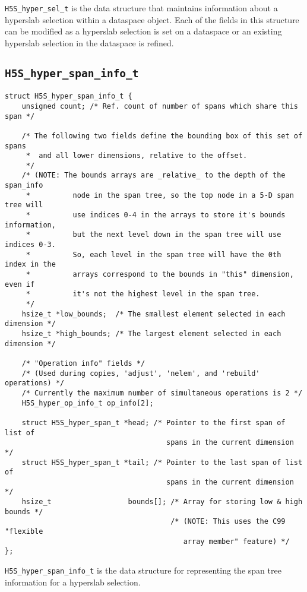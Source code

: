 \documentclass[../HDF5_RFC.tex]{subfiles}
\begin{document}
\texttt{H5S\_hyper\_sel\_t} is the data structure that maintains information about a
hyperslab selection within a dataspace object. Each of the fields in this structure
can be modified as a hyperslab selection is set on a dataspace or an existing hyperslab
selection in the dataspace is refined.

\subsection{\texttt{H5S\_hyper\_span\_info\_t}}
\label{apdx:h5s_struct_h5s_hyper_span_info_t}

\begin{verbatim}
struct H5S_hyper_span_info_t {
    unsigned count; /* Ref. count of number of spans which share this span */

    /* The following two fields define the bounding box of this set of spans
     *  and all lower dimensions, relative to the offset.
     */
    /* (NOTE: The bounds arrays are _relative_ to the depth of the span_info
     *          node in the span tree, so the top node in a 5-D span tree will
     *          use indices 0-4 in the arrays to store it's bounds information,
     *          but the next level down in the span tree will use indices 0-3.
     *          So, each level in the span tree will have the 0th index in the
     *          arrays correspond to the bounds in "this" dimension, even if
     *          it's not the highest level in the span tree.
     */
    hsize_t *low_bounds;  /* The smallest element selected in each dimension */
    hsize_t *high_bounds; /* The largest element selected in each dimension */

    /* "Operation info" fields */
    /* (Used during copies, 'adjust', 'nelem', and 'rebuild' operations) */
    /* Currently the maximum number of simultaneous operations is 2 */
    H5S_hyper_op_info_t op_info[2];

    struct H5S_hyper_span_t *head; /* Pointer to the first span of list of
                                      spans in the current dimension */
    struct H5S_hyper_span_t *tail; /* Pointer to the last span of list of
                                      spans in the current dimension */
    hsize_t                  bounds[]; /* Array for storing low & high bounds */
                                       /* (NOTE: This uses the C99 "flexible
                                          array member" feature) */
};
\end{verbatim}

\texttt{H5S\_hyper\_span\_info\_t} is the data structure for representing the span tree
information for a hyperslab selection.
\end{document}
